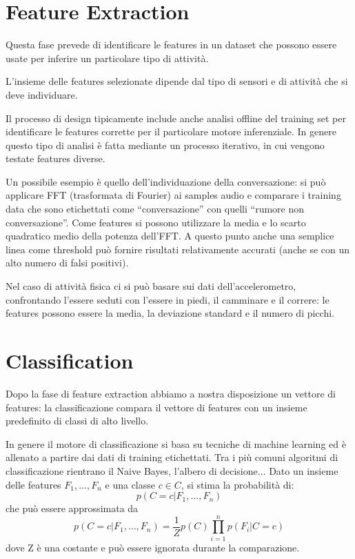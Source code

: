 \section{Feature Extraction}

Questa fase prevede di identificare le features in un dataset che possono essere
usate per inferire un particolare tipo di attività.

L'insieme delle features selezionate dipende dal tipo di sensori e di attività
che si deve individuare.

Il processo di design tipicamente include anche analisi
offline del training set per identificare le features corrette per il
particolare motore inferenziale.
In genere questo tipo di analisi è fatta mediante un processo iterativo, in cui
vengono testate features diverse.

Un possibile esempio è quello dell'individuazione della conversazione: si può
applicare FFT (trasformata di Fourier) ai samples audio e comparare i training
data che sono etichettati come ``conversazione'' con quelli ``rumore non
conversazione''.
Come features si possono utilizzare la media e lo scarto quadratico medio della
potenza dell'FFT.
A questo punto anche una semplice linea come threshold può fornire risultati
relativamente accurati (anche se con un alto numero di falsi positivi).

Nel caso di attività fisica ci si può basare sui dati dell'accelerometro,
confrontando l'essere seduti con l'essere in piedi, il camminare e il correre:
le features possono essere la media, la deviazione standard e il numero di
picchi.

\section{Classification}

Dopo la fase di feature extraction abbiamo a nostra disposizione un vettore di
features: la classificazione compara il vettore di features con un insieme
predefinito di classi di alto livello.

In genere il motore di classificazione si basa su tecniche di machine learning
ed è allenato a partire dai dati di training etichettati.
Tra i più comuni algoritmi di classificazione rientrano il Naive Bayes, l'albero
di decisione$\ldots$
\bigbreak
Dato un insieme delle features $F_1, \ldots, F_n$ e una classe $c \in C$, si
stima la probabilità di:
\begin{equation}
p(C=c|F_1, \ldots, F_n)
\end{equation}
che può essere approssimata da
\begin{equation}
p(C=c|F_1,\ldots,F_n)=\frac{1}{Z}p(C)\prod_{i=1}^{n}p(F_i|C=c)
\end{equation}
dove Z è una costante e può essere ignorata durante la comparazione.

